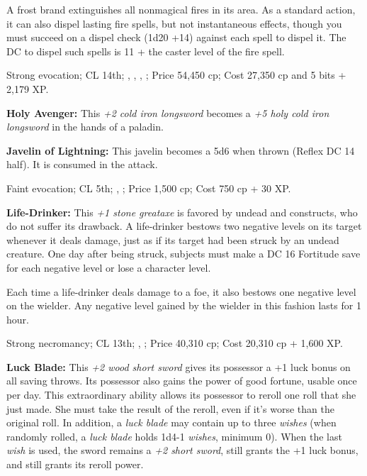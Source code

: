 A frost brand extinguishes all nonmagical fires in its area. As a standard action, it can also dispel lasting fire spells, but not instantaneous effects, though you must succeed on a dispel check (1d20 +14) against each spell to dispel it. The DC to dispel such spells is 11 + the caster level of the fire spell.

Strong evocation; CL 14th; , , , ; Price 54,450 cp; Cost 27,350 cp and 5 bits + 2,179 XP.

% 
\textbf{Holy Avenger:} This \emph{+2 cold iron longsword} becomes a \emph{+5 holy cold iron longsword} in the hands of a paladin.




\textbf{Javelin of Lightning:} This javelin becomes a 5d6  when thrown (Reflex DC 14 half). It is consumed in the attack.

Faint evocation; CL 5th; , ; Price 1,500 cp; Cost 750 cp + 30 XP.


\textbf{Life-Drinker:} This \emph{+1 stone greataxe} is favored by undead and constructs, who do not suffer its drawback. A life-drinker bestows two negative levels on its target whenever it deals damage, just as if its target had been struck by an undead creature. One day after being struck, subjects must make a DC 16 Fortitude save for each negative level or lose a character level.

Each time a life-drinker deals damage to a foe, it also bestows one negative level on the wielder. Any negative level gained by the wielder in this fashion lasts for 1 hour.

Strong necromancy; CL 13th; , ; Price 40,310 cp; Cost 20,310 cp + 1,600 XP.


\textbf{Luck Blade:} This \emph{+2 wood short sword} gives its possessor a +1 luck bonus on all saving throws. Its possessor also gains the power of good fortune, usable once per day. This extraordinary ability allows its possessor to reroll one roll that she just made. She must take the result of the reroll, even if it's worse than the original roll. In addition, a \emph{luck blade} may contain up to three \emph{wishes} (when randomly rolled, a \emph{luck blade} holds 1d4-1 \emph{wishes}, minimum 0). When the last \emph{wish} is used, the sword remains a \emph{+2 short sword}, still grants the +1 luck bonus, and still grants its reroll power.

